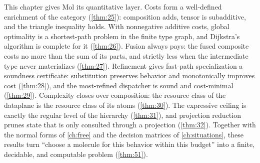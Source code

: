 This chapter gives Mol its quantitative layer. Costs form a well-defined
enrichment of the category (\autoref{thm:25}): composition adds, tensor is subadditive,
and the triangle inequality holds. With nonnegative additive costs, global
optimality is a shortest-path problem in the finite type graph, and Dijkstra's
algorithm is complete for it (\autoref{thm:26}). Fusion always pays: the fused composite
costs no more than the sum of its parts, and strictly less when the
intermediate type never materializes (\autoref{thm:27}). Refinement gives fast-path
specialization a soundness certificate: substitution preserves behavior and
monotonically improves cost (\autoref{thm:28}), and the most-refined dispatcher is sound
and cost-minimal (\autoref{thm:29}). Complexity closes over composition: the resource
class of the dataplane is the resource class of its atoms (\autoref{thm:30}). The
expressive ceiling is exactly the regular level of the hierarchy (\autoref{thm:31}), and
projection reduction prunes state that is only consulted through a projection
(\autoref{thm:32}). Together with the normal forms of \autoref{ch:free} and the decision
matrices of \autoref{ch:situations}, these results turn ``choose a molecule
for this behavior within this budget'' into a finite, decidable, and
computable problem (\autoref{thm:51}).
